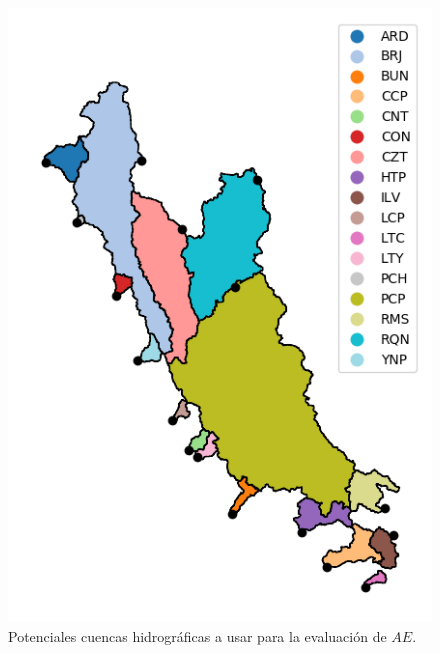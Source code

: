 \begin{figure}[ht!]
	\includegraphics[scale=1.1]{Images/00_all_basins.png}
	\centering
	\caption{Potenciales cuencas hidrográficas a usar para la evaluación de $AE$.}
	\label{fig:00_all_basins}
\end{figure}